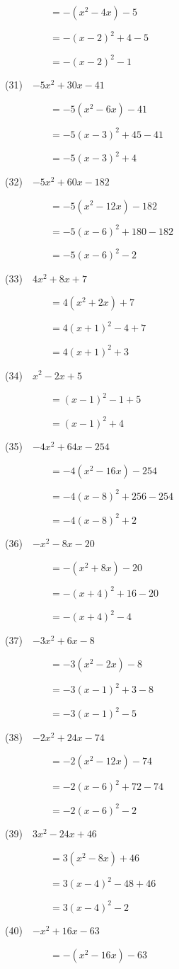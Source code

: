 \documentclass[a4j,twocolumn,10pt,fleqn]{jarticle}
\begin{document}
~~~~~~~~~$=-(x^2-4x)-5$

~~~~~~~~~$=-(x-2)^2 +4-5$

~~~~~~~~~$=-(x-2)^2-1$

(31)~~$-5x^2 +30x-41$

~~~~~~~~~$=-5(x^2-6x)-41$

~~~~~~~~~$=-5(x-3)^2 +45-41$

~~~~~~~~~$=-5(x-3)^2 +4$

(32)~~$-5x^2 +60x-182$

~~~~~~~~~$=-5(x^2-12x)-182$

~~~~~~~~~$=-5(x-6)^2 +180-182$

~~~~~~~~~$=-5(x-6)^2-2$

(33)~~$4x^2 +8x +7$

~~~~~~~~~$=4(x^2 +2x) +7$

~~~~~~~~~$=4(x +1)^2-4+7$

~~~~~~~~~$=4(x +1)^2 +3$

(34)~~$x^2-2x +5$

~~~~~~~~~$=(x-1)^2 -1+5$

~~~~~~~~~$=(x-1)^2 +4$

(35)~~$-4x^2 +64x-254$

~~~~~~~~~$=-4(x^2-16x)-254$

~~~~~~~~~$=-4(x-8)^2 +256-254$

~~~~~~~~~$=-4(x-8)^2 +2$

(36)~~$-x^2-8x-20$

~~~~~~~~~$=-(x^2 +8x)-20$

~~~~~~~~~$=-(x +4)^2 +16-20$

~~~~~~~~~$=-(x +4)^2-4$

(37)~~$-3x^2 +6x-8$

~~~~~~~~~$=-3(x^2-2x)-8$

~~~~~~~~~$=-3(x-1)^2 +3-8$

~~~~~~~~~$=-3(x-1)^2-5$

(38)~~$-2x^2 +24x-74$

~~~~~~~~~$=-2(x^2-12x)-74$

~~~~~~~~~$=-2(x-6)^2 +72-74$

~~~~~~~~~$=-2(x-6)^2-2$

(39)~~$3x^2-24x +46$

~~~~~~~~~$=3(x^2-8x) +46$

~~~~~~~~~$=3(x-4)^2-48+46$

~~~~~~~~~$=3(x-4)^2-2$

(40)~~$-x^2 +16x-63$

~~~~~~~~~$=-(x^2-16x)-63$
\end{document}
